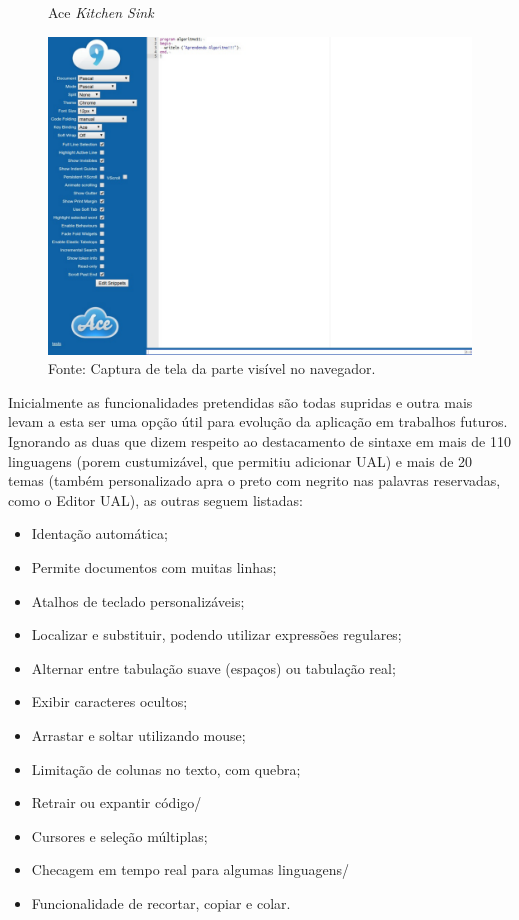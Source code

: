 \begin{figure}[h]
  \caption{\ifdraft{\color{green}}{}Ace \textit{Kitchen Sink}}\label{fig:ace-kitchensink}
  \centering
\includegraphics[width=\textwidth,keepaspectratio]{figures/ace-kitchensink.pdf}
  \caption*{\ifdraft{\color{green}}{}\footnotesize Fonte: Captura de tela da parte visível no navegador.}
\end{figure}

Inicialmente as funcionalidades pretendidas são todas supridas e outra mais levam a esta ser uma opção útil para evolução da aplicação em trabalhos futuros. Ignorando as duas que dizem respeito ao destacamento de sintaxe em mais de 110 linguagens (porem custumizável, que permitiu adicionar UAL) e mais de 20 temas (também personalizado apra o preto com negrito nas palavras reservadas, como o Editor UAL), as outras seguem listadas:

\begin{itemize}

\item Identação automática;
\item Permite documentos com muitas linhas;
\item Atalhos de teclado personalizáveis;
\item Localizar e substituir, podendo utilizar expressões regulares;
\item Alternar entre tabulação suave (espaços) ou tabulação real;
\item Exibir caracteres ocultos;
\item Arrastar e soltar utilizando mouse;
\item Limitação de colunas no texto, com quebra;
\item Retrair ou expantir código/
\item Cursores e seleção múltiplas;
\item Checagem em tempo real para algumas linguagens/
\item Funcionalidade de recortar, copiar e colar.

\end{itemize}

